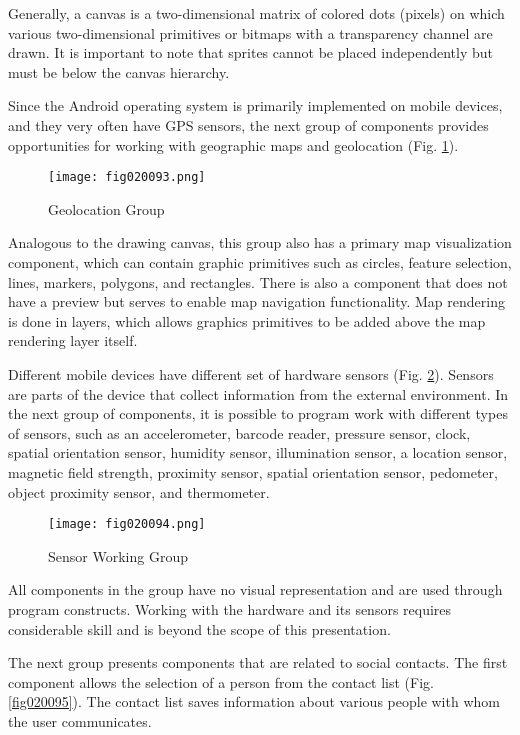 Generally, a canvas is a two-dimensional matrix of colored dots (pixels) on which various two-dimensional primitives or bitmaps with a transparency channel are drawn. It is important to note that sprites cannot be placed independently but must be below the canvas hierarchy.

Since the Android operating system is primarily implemented on mobile devices, and they very often have GPS sensors, the next group of components provides opportunities for working with geographic maps and geolocation (Fig. \ref{fig020093}).

\begin{figure}[H]
   \centering
   \texttt{[image: fig020093.png]}
   \caption{Geolocation Group}
\label{fig020093}
\end{figure}

Analogous to the drawing canvas, this group also has a primary map visualization component, which can contain graphic primitives such as circles, feature selection, lines, markers, polygons, and rectangles. There is also a component that does not have a preview but serves to enable map navigation functionality. Map rendering is done in layers, which allows graphics primitives to be added above the map rendering layer itself.

Different mobile devices have different set of hardware sensors (Fig. \ref{fig020094}). Sensors are parts of the device that collect information from the external environment. In the next group of components, it is possible to program work with different types of sensors, such as an accelerometer, barcode reader, pressure sensor, clock, spatial orientation sensor, humidity sensor, illumination sensor, a location sensor, magnetic field strength, proximity sensor, spatial orientation sensor, pedometer, object proximity sensor, and thermometer.

\begin{figure}[H]
   \centering
   \texttt{[image: fig020094.png]}
   \caption{Sensor Working Group}
\label{fig020094}
\end{figure}

All components in the group have no visual representation and are used through program constructs. Working with the hardware and its sensors requires considerable skill and is beyond the scope of this presentation.

The next group presents components that are related to social contacts. The first component allows the selection of a person from the contact list (Fig. \ref{fig020095}). The contact list saves information about various people with whom the user communicates.


